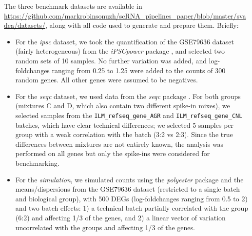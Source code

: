 \documentclass{bmcart}
\begin{document}
The three benchmark datasets are available in \url{https://github.com/markrobinsonuzh/scRNA\_pipelines\_paper/blob/master/svadea/datasets/}, along with all code used to generate and prepare them. Briefly:
\begin{itemize}
    \item For the \textit{ipsc} dataset, we took the quantification of the GSE79636 dataset (fairly heterogeneous) from the \textit{iPSCpower} package \citep{germainTamingHumanGenetic2017}, and selected two random sets of 10 samples. No further variation was added, and log-foldchanges ranging from 0.25 to 1.25 were added to the counts of 300 random genes. All other genes were assumed to be negatives.
    \item For the \textit{seqc} dataset, we used data from the \textit{seqc} package \citep{ComprehensiveAssessment2014}. For both groups (mixtures C and D, which also contain two different spike-in mixes), we selected samples from the \texttt{ILM\_refseq\_gene\_AGR} and \texttt{ILM\_refseq\_gene\_CNL} batches, which have clear technical differences; we selected 5 samples per group with a weak correlation with the batch (3:2 vs 2:3). Since the true differences between mixtures are not entirely known, the analysis was performed on all genes but only the spike-ins were considered for benchmarking.
    \item For the \textit{simulation}, we simulated counts using the \textit{polyester} package \citep{frazeePolyesterSimulating2015} and the means/dispersions from the GSE79636 dataset (restricted to a single batch and biological group), with 500 DEGs (log-foldchanges ranging from 0.5 to 2) and two batch effects: 1) a technical batch partially correlated with the group (6:2) and affecting 1/3 of the genes, and 2) a linear vector of variation uncorrelated with the groups and affecting 1/3 of the genes.
\end{itemize}



\end{document}
